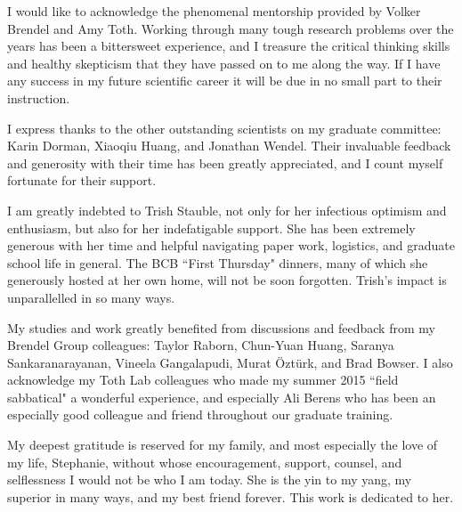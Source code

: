 
I would like to acknowledge the phenomenal mentorship provided by Volker Brendel and Amy Toth.
Working through many tough research problems over the years has been a bittersweet experience, and I treasure the critical thinking skills and healthy skepticism that they have passed on to me along the way.
If I have any success in my future scientific career it will be due in no small part to their instruction.

I express thanks to the other outstanding scientists on my graduate committee: Karin Dorman, Xiaoqiu Huang, and Jonathan Wendel.
Their invaluable feedback and generosity with their time has been greatly appreciated, and I count myself fortunate for their support.

I am greatly indebted to Trish Stauble, not only for her infectious optimism and enthusiasm, but also for her indefatigable support.
She has been extremely generous with her time and helpful navigating paper work, logistics, and graduate school life in general.
The BCB ``First Thursday" dinners, many of which she generously hosted at her own home, will not be soon forgotten.
Trish's impact is unparallelled in so many ways.

My studies and work greatly benefited from discussions and feedback from my Brendel Group colleagues:
Taylor Raborn, Chun-Yuan Huang, Saranya Sankaranarayanan, Vineela Gangalapudi, Murat {\"O}zt{\"u}rk, and Brad Bowser.
I also acknowledge my Toth Lab colleagues who made my summer 2015 ``field sabbatical" a wonderful experience, and especially Ali Berens who has been an especially good colleague and friend throughout our graduate training.

My deepest gratitude is reserved for my family, and most especially the love of my life, Stephanie, without whose encouragement, support, counsel, and selflessness I would not be who I am today.
She is the yin to my yang, my superior in many ways, and my best friend forever.
This work is dedicated to her.
